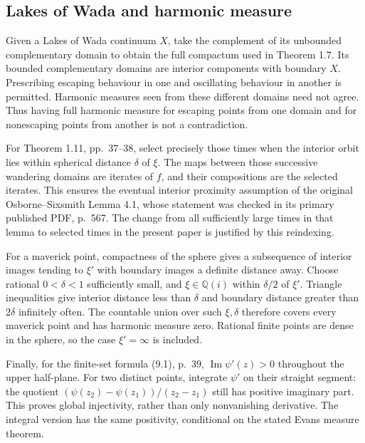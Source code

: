 \documentclass[10pt]{article}
\begin{document}
\subsection*{Lakes of Wada and harmonic measure}
Given a Lakes of Wada continuum \(X\), take the complement of its unbounded complementary domain to obtain the full compactum used in Theorem 1.7. Its bounded complementary domains are interior components with boundary \(X\). Prescribing escaping behaviour in one and oscillating behaviour in another is permitted. Harmonic measures seen from these different domains need not agree. Thus having full harmonic measure for escaping points from one domain and for nonescaping points from another is not a contradiction.\par
For Theorem 1.11, pp. 37–38, select precisely those times when the interior orbit lies within spherical distance \(\delta\) of \(\xi\). The maps between those successive wandering domains are iterates of \(f\), and their compositions are the selected iterates. This ensures the eventual interior proximity assumption of the original Osborne–Sixsmith Lemma 4.1, whose statement was checked in its primary published PDF, p. 567. The change from all sufficiently large times in that lemma to selected times in the present paper is justified by this reindexing.\par
For a maverick point, compactness of the sphere gives a subsequence of interior images tending to \(\xi'\) with boundary images a definite distance away. Choose rational \(0<\delta<1\) sufficiently small, and \(\xi\in\mathbb Q(i)\) within \(\delta/2\) of \(\xi'\). Triangle inequalities give interior distance less than \(\delta\) and boundary distance greater than \(2\delta\) infinitely often. The countable union over such \(\xi,\delta\) therefore covers every maverick point and has harmonic measure zero. Rational finite points are dense in the sphere, so the case \(\xi'=\infty\) is included.\par
Finally, for the finite-set formula (9.1), p. 39, \(\operatorname{Im}\psi'(z)>0\) throughout the upper half-plane. For two distinct points, integrate \(\psi'\) on their straight segment: the quotient \((\psi(z_2)-\psi(z_1))/(z_2-z_1)\) still has positive imaginary part. This proves global injectivity, rather than only nonvanishing derivative. The integral version has the same positivity, conditional on the stated Evans measure theorem.\par
\end{document}
